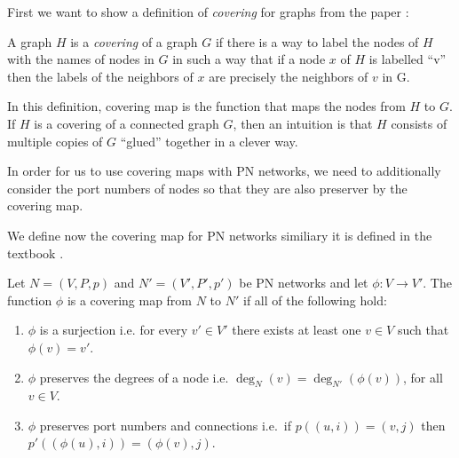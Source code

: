 First we want to show a definition of \emph{covering} for graphs from the paper
\cite{DBLP:conf/stoc/Angluin80}:
\begin{displayquote}
A graph $H$ is a \emph{covering} of a graph $G$ if there is a way to label the nodes of $H$ with the names of nodes in $G$ in such a way that if a node $x$ of $H$ is labelled ``v'' then the labels of the neighbors of $x$ are precisely the neighbors of $v$ in G.
\end{displayquote}
In this definition, covering map is the function that maps the nodes from $H$ to $G$.
If $H$ is a covering of a connected graph $G$, then an intuition is that $H$ consists of multiple copies of $G$ ``glued'' together in a clever way.


In order for us to use covering maps with PN networks, we need to additionally consider the port numbers of nodes so that they are also preserver by the covering map.

We define now the covering map for PN networks similiary it is defined in the textbook \cite{HirvonenSuomelaDistAlg2020}.

\begin{definition} \label{def:covering_map}
  Let $N=(V, P, p)$ and $N'=(V', P', p')$ be PN networks and let $\phi\colon V \rightarrow V'$.
  The function $\phi$ is a covering map from $N$ to $N'$ if all of the following hold:
  \begin{enumerate}
    \item $\phi$ is a surjection i.e. for every $v' \in V'$ there exists at least one $v \in V$ such that $\phi(v) = v'$.
    \item $\phi$ preserves the degrees of a node i.e. $\deg_N(v) = \deg_{N'}(\phi(v))$, for all $v \in V$.
    \item $\phi$ preserves port numbers and connections i.e.\ if $p((u, i)) = (v, j)$ then $p'((\phi(u), i)) = (\phi(v), j)$.
  \end{enumerate}
\end{definition}

